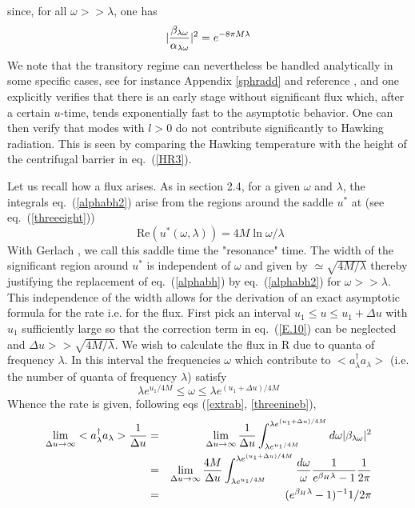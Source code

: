 \documentclass[12pt,oneside]{report}
\def\om{\omega	}
\def\la{\lambda}
\begin{document}
since, for all $\om >> \la$, one has
\begin{equation}
\vert {\beta_{\la \om} \over \alpha_{\la \om}} 
\vert ^2 = e^{-8\pi M \lambda}
\label{alphabh2B}
\end{equation}
We note that the transitory regime can nevertheless be handled
 analytically in
some specific cases,
see for instance Appendix \ref{sphradd} and reference
\cite{MaPa}, and one explicitly verifies that there
is an early stage without significant flux which, after  a certain $u$-time, tends
exponentially fast to the asymptotic behavior.
One can then verify that modes with $l>0$ do not contribute significantly 
to Hawking radiation. This is seen by comparing the Hawking temperature with the
height of the centrifugal barrier in eq.~(\ref{HR3}).

Let us recall how a flux arises.
As in section 2.4, 
for a given $ \omega$ and $
\lambda$, the integrals eq.~(\ref{alphabh2}) arise from
the regions around the saddle $u^*$ at (see eq.~(\ref{threeeight}))
\begin{equation}
\mbox{ Re}(u^*(\omega, \lambda))
= 4M \ln \omega/\lambda
\label{reson}
\end{equation}
With Gerlach \cite{Gerl}, we call this saddle time the "resonance" time. 
The width of the significant region around
$u^*$ is independent of $ \omega $ and given by $\simeq \sqrt{4 M / \lambda}$
thereby justifying the replacement 
of eq.~(\ref{alphabh}) by eq.~(\ref{alphabh2}) for $\om >> \la$.
This independence of the width allows for the derivation of an exact
asymptotic formula for the rate i.e.  for the flux. First pick an
interval $ u_1  \leq u \leq
u_1 + \Delta u $ with $ u_1$ sufficiently large so that the 
correction term in eq.~(\ref{E.10}) can be neglected
and $\Delta u >> \sqrt{4 M /
\lambda}$.  We
wish to calculate the flux in R due to quanta of frequency $\lambda$. In this
interval the frequencies $\omega$ which contribute to 
$<a^\dagger_\la a_\la > $ (i.e. the  number of quanta of frequency
$\lambda$) satisfy
\begin{equation}
\lambda e^{u_1/4M} \leq \omega \leq \lambda
e^{(u_1+\Delta u) /4M}
\label{reson2}
\end{equation}
 Whence the rate is given, following eqs (\ref{extrab}, \ref{threenineb}), 
\begin {eqnarray}
\lim_{\Delta u \to \infty} 
<a^\dagger_\la a_\la >{1 \over \Delta u}  &=&
\lim_{\Delta u \to \infty}
{1 \over \Delta u} \int_{\lambda e^{u_1/4M}}^{\lambda e^
{(u_1+\Delta u) /4M}} d\omega \vert \beta_{\la \om} \vert ^2 \nonumber\\
&=&
\lim_{\Delta u \to \infty} 
{4M \over \Delta u} \int_{\lambda e^{u_1/4M}}^{\lambda e^
{(u_1+\Delta u) /4M}} {d\omega \over \omega}  
{1 \over e^{\beta_H \lambda}-1} { 1
\over 2 \pi }\nonumber\\
&=& (e^{\beta_H \lambda}-1)^{-1} {1 /2 \pi}
\label {1.36}
\end {eqnarray}
\end{document}
